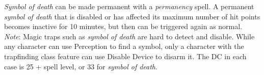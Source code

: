 \textit{Symbol of death }can be made permanent with a \textit{permanency }spell. A permanent \textit{symbol of death }that is disabled or has affected its maximum number of hit points becomes inactive for 10 minutes, but then can be triggered again as normal.\\
\textit{Note}: Magic traps such as \textit{symbol of death }are hard to detect and disable. While any character can use Perception to find a symbol, only a character with the trapfinding class feature can use Disable Device to disarm it. The DC in each case is 25 + spell level, or 33 for \textit{symbol of death}.\\
